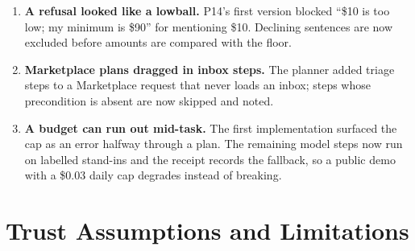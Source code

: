 \documentclass[11pt]{article}
\begin{document}
\begin{enumerate}[leftmargin=*]
\item \textbf{A refusal looked like a lowball.} P14's first version blocked ``\$10 is too low; my minimum is \$90'' for
mentioning \$10. Declining sentences are now excluded before amounts are compared with the floor.
\item \textbf{Marketplace plans dragged in inbox steps.} The planner added triage steps to a Marketplace request that
never loads an inbox; steps whose precondition is absent are now skipped and noted.
\item \textbf{A budget can run out mid-task.} The first implementation surfaced the cap as an error halfway through a
plan. The remaining model steps now run on labelled stand-ins and the receipt records the fallback, so a public demo
with a \$0.03 daily cap degrades instead of breaking.
\end{enumerate}

\section{Trust Assumptions and Limitations}
\end{document}
